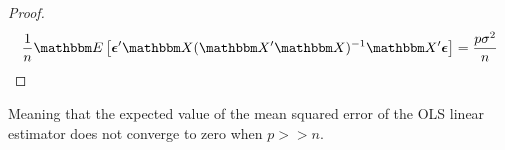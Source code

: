 \begin{proof}
\begin{align*}
\frac{1}{n} \E{
    \Vec{\epsilon}'\Mat{X}(\Mat{X}'\Mat{X})^{-1}\Mat{X}'\Vec{\epsilon}
}
&= \frac{p\sigma^2}{n}\\
\end{align*}

\end{proof}

Meaning that the expected value of the mean squared error of the OLS linear estimator does not converge to zero when $p >> n$.